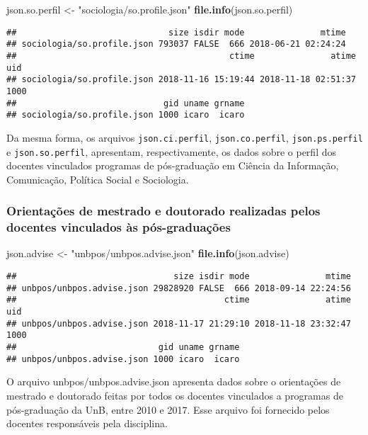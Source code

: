 \documentclass[]{article}
\newenvironment{Shaded}{\begin{snugshade}}{\end{snugshade}}
\newcommand{\KeywordTok}[1]{\textcolor[rgb]{0.13,0.29,0.53}{\textbf{#1}}}
\newcommand{\StringTok}[1]{\textcolor[rgb]{0.31,0.60,0.02}{#1}}
\newcommand{\NormalTok}[1]{#1}
\begin{document}
\begin{Shaded}
\begin{Highlighting}[]
\NormalTok{json.so.perfil <-}\StringTok{ "sociologia/so.profile.json"}
\KeywordTok{file.info}\NormalTok{(json.so.perfil)}
\end{Highlighting}
\end{Shaded}

\begin{verbatim}
##                              size isdir mode               mtime
## sociologia/so.profile.json 793037 FALSE  666 2018-06-21 02:24:24
##                                          ctime               atime  uid
## sociologia/so.profile.json 2018-11-16 15:19:44 2018-11-18 02:51:37 1000
##                             gid uname grname
## sociologia/so.profile.json 1000 icaro  icaro
\end{verbatim}

Da mesma forma, os arquivos \texttt{json.ci.perfil},
\texttt{json.co.perfil}, \texttt{json.ps.perfil} e
\texttt{json.so.perfil}, apresentam, respectivamente, os dados sobre o
perfil dos docentes vinculados programas de pós-graduação em Ciência da
Informação, Comunicação, Política Social e Sociologia.

\subsubsection{Orientações de mestrado e doutorado realizadas pelos
docentes vinculados às
pós-graduações}\label{orientacoes-de-mestrado-e-doutorado-realizadas-pelos-docentes-vinculados-as-pos-graduacoes}

\begin{Shaded}
\begin{Highlighting}[]
\NormalTok{json.advise <-}\StringTok{ "unbpos/unbpos.advise.json"}
\KeywordTok{file.info}\NormalTok{(json.advise)}
\end{Highlighting}
\end{Shaded}

\begin{verbatim}
##                               size isdir mode               mtime
## unbpos/unbpos.advise.json 29828920 FALSE  666 2018-09-14 22:24:56
##                                         ctime               atime  uid
## unbpos/unbpos.advise.json 2018-11-17 21:29:10 2018-11-18 23:32:47 1000
##                            gid uname grname
## unbpos/unbpos.advise.json 1000 icaro  icaro
\end{verbatim}

O arquivo unbpos/unbpos.advise.json apresenta dados sobre o orientações
de mestrado e doutorado feitas por todos os docentes vinculados a
programas de pós-graduação da UnB, entre 2010 e 2017. Esse arquivo foi
fornecido pelos docentes responsáveis pela disciplina.
\end{document}
